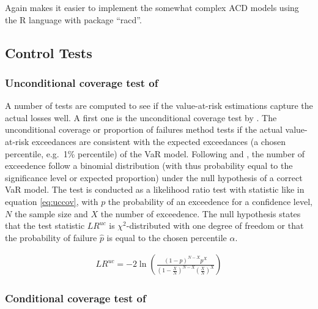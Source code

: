 \documentclass[a4paper, twoside]{templates/ociamthesis}
\begin{document}
Again \textcite{ghalanos2016} makes it easier to implement the somewhat complex ACD models using the R language with package ``racd''.

\hypertarget{control-tests}{%
\subsection{Control Tests}\label{control-tests}}

\hypertarget{unconditional-coverage-test-of-kupiec1995}{%
\subsubsection{\texorpdfstring{Unconditional coverage test of \textcite{kupiec1995}}{Unconditional coverage test of @kupiec1995}}\label{unconditional-coverage-test-of-kupiec1995}}

A number of tests are computed to see if the value-at-risk estimations capture the actual losses well. A first one is the unconditional coverage test by \textcite{kupiec1995}. The unconditional coverage or proportion of failures method tests if the actual value-at-risk exceedances are consistent with the expected exceedances (a chosen percentile, e.g.~1\% percentile) of the VaR model. Following \textcite{kupiec1995} and \textcite{ghalanos2020}, the number of exceedence follow a binomial distribution (with thus probability equal to the significance level or expected proportion) under the null hypothesis of a correct VaR model. The test is conducted as a likelihood ratio test with statistic like in equation \eqref{eq:uccov}, with \(p\) the probability of an exceedence for a confidence level, \(N\) the sample size and \(X\) the number of exceedence. The null hypothesis states that the test statistic \(L R^{u c}\) is \(\chi^2\)-distributed with one degree of freedom or that the probability of failure \(\hat p\) is equal to the chosen percentile \(\alpha\).

\begin{align}
L R^{u c}=-2 \ln \left(\frac{(1-p)^{N-X} p^{X}}{\left(1-\frac{X}{N}\right)^{N-X}\left(\frac{X}{N}\right)^{X}}\right)
\label{eq:uccov}
\end{align}

\hypertarget{conditional-coverage-test-of-christoffersen2001}{%
\subsubsection{\texorpdfstring{Conditional coverage test of \textcite{christoffersen2001}}{Conditional coverage test of @christoffersen2001}}\label{conditional-coverage-test-of-christoffersen2001}}
\end{document}
